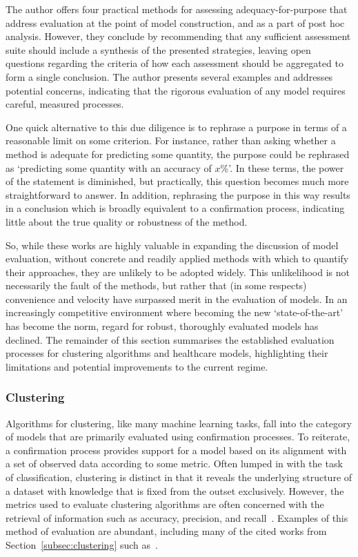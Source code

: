 The author offers four practical methods for assessing adequacy-for-purpose that
address evaluation at the point of model construction, and as a part of post hoc
analysis. However, they conclude by recommending that any sufficient assessment
suite should include a synthesis of the presented strategies, leaving open
questions regarding the criteria of how each assessment should be aggregated to
form a single conclusion. The author presents several examples and addresses
potential concerns, indicating that the rigorous evaluation of any model
requires careful, measured processes.

One quick alternative to this due diligence is to rephrase a purpose in terms of
a reasonable limit on some criterion. For instance, rather than asking whether a
method is adequate for predicting some quantity, the purpose could be rephrased
as `predicting some quantity with an accuracy of \(x\)\%'. In these terms, the
power of the statement is diminished, but practically, this question becomes
much more straightforward to answer. In addition, rephrasing the purpose in this
way results in a conclusion which is broadly equivalent to a confirmation
process, indicating little about the true quality or robustness of the method.

So, while these works are highly valuable in expanding the discussion of model
evaluation, without concrete and readily applied methods with which to quantify
their approaches, they are unlikely to be adopted widely. This unlikelihood is
not necessarily the fault of the methods, but rather that (in some respects)
convenience and velocity have surpassed merit in the evaluation of models. In an
increasingly competitive environment where becoming the new `state-of-the-art'
has become the norm, regard for robust, thoroughly evaluated models has
declined. The remainder of this section summarises the established evaluation
processes for clustering algorithms and healthcare models, highlighting their
limitations and potential improvements to the current regime.

\subsubsection{Clustering}\label{subsubsec:clustering_evaluation}

Algorithms for clustering, like many machine learning tasks, fall into the
category of models that are primarily evaluated using confirmation processes. To
reiterate, a confirmation process provides support for a model based on its
alignment with a set of observed data according to some metric. Often lumped in
with the task of classification, clustering is distinct in that it reveals the
underlying structure of a dataset with knowledge that is fixed from the outset
exclusively. However, the metrics used to evaluate clustering algorithms are
often concerned with the retrieval of information such as accuracy, precision,
and recall~\cite{Manning2008}. Examples of this method of evaluation are
abundant, including many of the cited works from Section~\ref{subsec:clustering}
such as~\cite{Agrawal1998,Aljarah2019,Bakr2015,Cao2009,Huang1998}.

